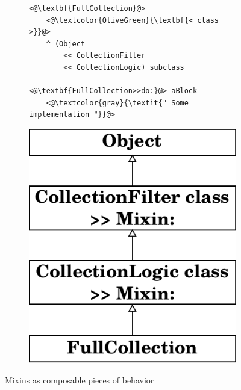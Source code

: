 \begin{figure}[!htp]
\centering
\begin{subfigure}[b]{0.6\textwidth}
\begin{lstlisting}
<@\textbf{FullCollection}@>
    <@\textcolor{OliveGreen}{\textbf{< class >}}@>
    ^ (Object 
        << CollectionFilter 
        << CollectionLogic) subclass

<@\textbf{FullCollection>>do:}@> aBlock
    <@\textcolor{gray}{\textit{" Some implementation "}}@>
\end{lstlisting}
\end{subfigure}
\qquad
\begin{subfigure}[b]{0.25\textwidth}
    \includegraphics[width=\textwidth]{usecase_classgen_v2.pdf}
\end{subfigure}
\caption{Mixins as composable pieces of behavior}
\label{fig:mixin_composable}
\end{figure}

